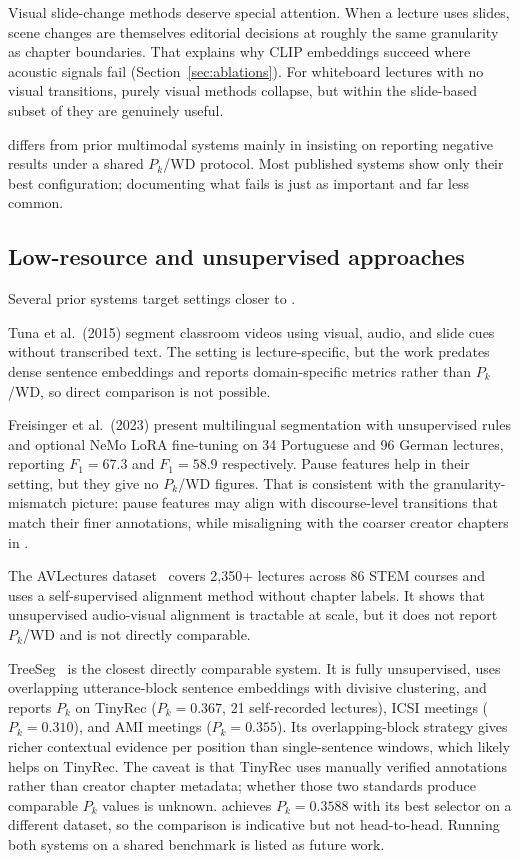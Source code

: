 Visual slide-change methods deserve special attention. When a lecture uses
slides, scene changes are themselves editorial decisions at roughly the same
granularity as chapter boundaries. That explains why CLIP embeddings succeed
where acoustic signals fail (Section~\ref{sec:ablations}). For whiteboard
lectures with no visual transitions, purely visual methods collapse, but
within the slide-based subset of \dataset{} they are genuinely useful.

\lecseg{} differs from prior multimodal systems mainly in insisting on
reporting negative results under a shared $P_k$/WD protocol. Most published
systems show only their best configuration; documenting what fails is just as
important and far less common.

\subsection{Low-resource and unsupervised approaches}
\label{sec:low_resource_lit}

Several prior systems target settings closer to \lecseg{}.

Tuna et al.\ (2015) segment classroom videos using visual, audio, and slide
cues without transcribed text. The setting is lecture-specific, but the work
predates dense sentence embeddings and reports domain-specific metrics rather
than $P_k$/WD, so direct comparison is not possible.

Freisinger et al.\ (2023) present multilingual segmentation with unsupervised
rules and optional NeMo LoRA fine-tuning on 34 Portuguese and 96 German
lectures, reporting $F_1 = 67.3$ and $F_1 = 58.9$ respectively. Pause
features help in their setting, but they give no $P_k$/WD figures. That is
consistent with the granularity-mismatch picture: pause features may align
with discourse-level transitions that match their finer annotations, while
misaligning with the coarser creator chapters in \dataset{}.

The AVLectures dataset~\cite{yang2023_vidchapters} covers 2,350+ lectures
across 86 STEM courses and uses a self-supervised alignment method without
chapter labels. It shows that unsupervised audio-visual alignment is tractable
at scale, but it does not report $P_k$/WD and is not directly comparable.

TreeSeg~\cite{gklezakos2024_treeseg} is the closest directly comparable
system. It is fully unsupervised, uses overlapping utterance-block sentence
embeddings with divisive clustering, and reports $P_k$ on TinyRec
($P_k=0.367$, 21 self-recorded lectures), ICSI meetings ($P_k=0.310$),
and AMI meetings ($P_k=0.355$). Its overlapping-block strategy gives richer
contextual evidence per position than single-sentence windows, which likely
helps on TinyRec. The caveat is that TinyRec uses manually verified
annotations rather than creator chapter metadata; whether those two standards
produce comparable $P_k$ values is unknown. \lecseg{} achieves $P_k=0.3588$
with its best selector on a different dataset, so the comparison is indicative
but not head-to-head. Running both systems on a shared benchmark is listed as
future work.

